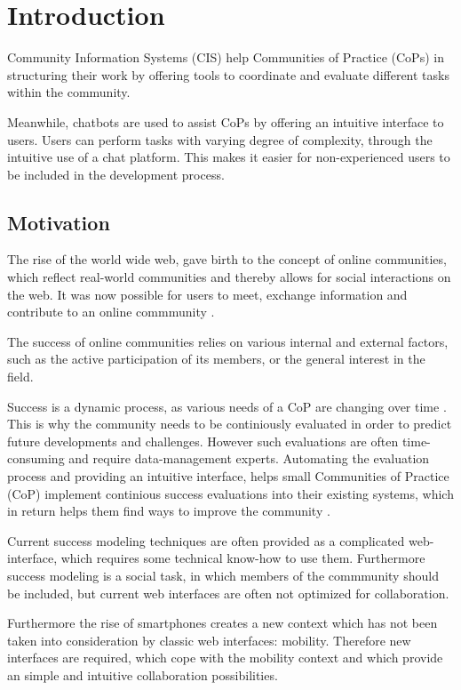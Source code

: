 \chapter{Introduction}
Community Information Systems (CIS) help Communities of Practice (CoPs) in structuring their work by offering tools to coordinate and evaluate different tasks within the community.

Meanwhile, chatbots are used to assist CoPs by offering an intuitive interface to users. Users can perform tasks with varying degree of complexity, through the intuitive use of a chat platform. This makes it easier for non-experienced users to be included in the development process.

\section{Motivation}
The rise of the world wide web, gave birth to the concept of online communities, which reflect real-world communities and thereby allows for social interactions on the web. It was now possible for users to meet, exchange information and contribute to an online commmunity \cite{Renz08}.

The success of online communities relies on various internal and external factors, such as the active participation of its members, or the general interest in the field.

Success is a dynamic process, as various needs of a CoP are changing over time \cite{Renz08,GKJa08}. This is why the community needs to be continiously evaluated in order to predict future developments and challenges. However such evaluations are often time-consuming and require data-management experts. Automating the evaluation process and providing an intuitive interface, helps small Communities of Practice (CoP) implement continious success evaluations into their existing systems, which in return helps them find ways to improve the community \cite{Renz08}.

Current success modeling techniques are often provided as a complicated web-interface, which requires some technical know-how to use them. Furthermore success modeling is a social task, in which members of the commmunity should be included, but current web interfaces are often not optimized for collaboration.

Furthermore the rise of smartphones creates a new context which has not been taken into consideration by classic web interfaces: mobility.
Therefore new interfaces are required, which cope with the mobility context and which provide an simple and intuitive collaboration possibilities.
\newpage

